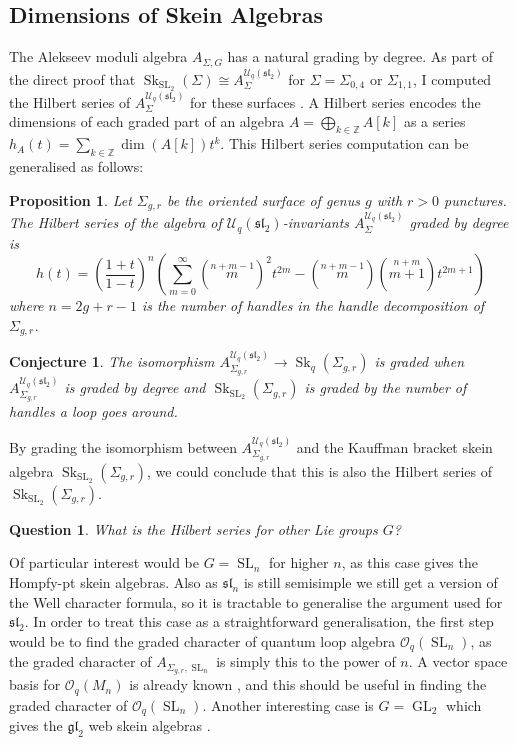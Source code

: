 \documentclass{article}
\newcommand{\Sk}{\operatorname{Sk}}
\newcommand{\SL}{\operatorname{SL}}
\newcommand{\GL}{\operatorname{GL}}
\newcommand{\gl}{\mathfrak{gl}}
\newcommand{\slgroup}{\mathfrak{sl}}
\newtheorem{prop}[thm]{Proposition}
\newtheorem{conj}[thm]{Conjecture}
\newtheorem{qs}[thm]{Question}
\begin{document}
\subsection{Dimensions of Skein Algebras}

The Alekseev moduli algebra $A_{\Sigma, G}$ has a natural grading by degree. As part of the direct proof that $\Sk_{\SL_2}(\Sigma) \cong A_{\Sigma}^{\mathcal{U}_q(\slgroup_2)}$ for $\Sigma = \Sigma_{0,4}$ or $\Sigma_{1,1}$, I computed the Hilbert series of  $A_{\Sigma}^{\mathcal{U}_q(\slgroup_2)}$ for these surfaces \cite{C1}. A Hilbert series encodes the dimensions of each graded part of an algebra $A = \bigoplus_{k \in \mathbb{Z}} A[k]$ as a series $h_A(t) = \sum_{k \in \mathbb{Z}} \dim(A[k]) t^k$.
This Hilbert series computation can be generalised as follows:
\begin{prop}
Let $\Sigma_{g,r}$ be the oriented surface of genus $g$ with $r>0$ punctures. The Hilbert series of the algebra of $\mathcal{U}_q(\slgroup_2)$-invariants $A_{\Sigma}^{\mathcal{U}_q(\slgroup_2)}$ graded by degree is 
\[
h(t) = \left(\frac{1+t}{1-t}\right)^n \left(\sum_{m=0}^{\infty} \left(\stackrel{n+m-1}{m} \right)^2 t^{2m} - \left(\stackrel{n+m-1}{m}\right) \left(\stackrel{n+m}{m+1}\right) t^{2m+1}\right)
\]
where $n = 2g+r-1$ is the number of handles in the handle decomposition of $\Sigma_{g,r}$. 
\end{prop}
\begin{conj}
The isomorphism $A_{\Sigma_{g,r}}^{\mathcal{U}_q(\slgroup_2)} \to \Sk_q(\Sigma_{g,r})$ is graded when $A_{\Sigma_{g,r}}^{\mathcal{U}_q(\slgroup_2)}$ is graded by degree and $\Sk_{\SL_2}(\Sigma_{g,r})$ is graded by the number of handles a loop goes around. 
\end{conj}
By grading the isomorphism between $A_{\Sigma_{g,r}}^{\mathcal{U}_q(\slgroup_2)}$ and the Kauffman bracket skein algebra $\Sk_{\SL_2}(\Sigma_{g,r})$, we could conclude that this is also the Hilbert series of $\Sk_{\SL_2}(\Sigma_{g,r})$. 

\begin{qs}
What is the Hilbert series for other Lie groups $G$?
\end{qs}

Of particular interest would be $G = \SL_n$ for higher $n$, as this case gives the Hompfy-pt skein algebras. Also as $\slgroup_n$ is still semisimple we still get a version of the Well character formula, so it is tractable to generalise the argument used for $\slgroup_2$. In order to treat this case as a straightforward generalisation, the first step would be to find the graded character of quantum loop algebra $\mathscr{O}_q(\SL_n)$, as the graded character of $A_{\Sigma_{g,r}, \SL_n}$ is simply this to the power of $n$. A vector space basis for $\mathscr{O}_q(M_n)$ is already known \cite{DomokosLenagan05}, and this should be useful in finding the graded character of $\mathscr{O}_q(\SL_n)$.
Another interesting case is $G = \GL_2$ which gives the $\gl_2$ web skein algebras \cite{QueffelecWedrich18}.
\end{document}
